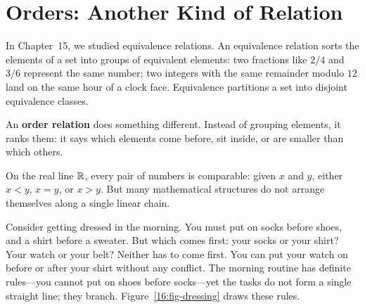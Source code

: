 \section{Orders: Another Kind of Relation}
\chapterline

In Chapter~15, we studied equivalence relations. An equivalence relation sorts the elements of a set into groups of equivalent elements: two fractions like $2/4$ and $3/6$ represent the same number; two integers with the same remainder modulo $12$ land on the same hour of a clock face. Equivalence partitions a set into disjoint equivalence classes.

An \textbf{order relation} does something different. Instead of grouping elements, it ranks them: it says which elements come before, sit inside, or are smaller than which others.

On the real line $\mathbb{R}$, every pair of numbers is comparable: given $x$ and $y$, either $x < y$, $x = y$, or $x > y$. But many mathematical structures do not arrange themselves along a single linear chain.

Consider getting dressed in the morning. You must put on socks before shoes, and a shirt before a sweater. But which comes first: your socks or your shirt? Your watch or your belt? Neither has to come first. You can put your watch on before or after your shirt without any conflict. The morning routine has definite rules---you cannot put on shoes before socks---yet the tasks do not form a single straight line; they branch. Figure~\ref{16:fig-dressing} draws these rules.

